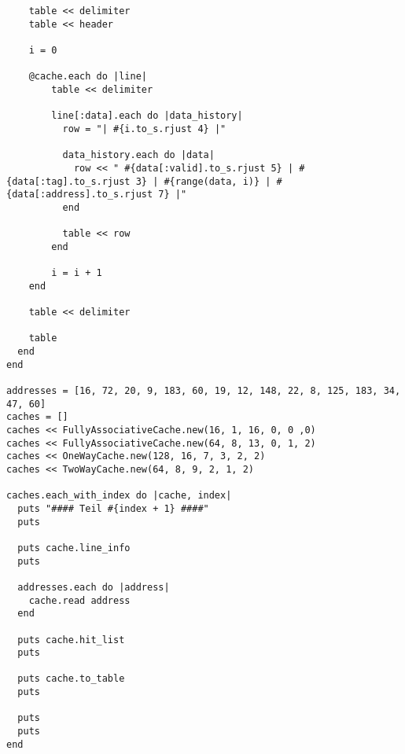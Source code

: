 \documentclass[10pt,a4paper]{article}
\begin{document}
\begin{lstlisting}
    table << delimiter
    table << header

    i = 0

    @cache.each do |line|
        table << delimiter

        line[:data].each do |data_history|
          row = "| #{i.to_s.rjust 4} |"

          data_history.each do |data|
            row << " #{data[:valid].to_s.rjust 5} | #{data[:tag].to_s.rjust 3} | #{range(data, i)} | #{data[:address].to_s.rjust 7} |"
          end

          table << row
        end

        i = i + 1
    end

    table << delimiter

    table
  end
end

addresses = [16, 72, 20, 9, 183, 60, 19, 12, 148, 22, 8, 125, 183, 34, 47, 60]
caches = []
caches << FullyAssociativeCache.new(16, 1, 16, 0, 0 ,0)
caches << FullyAssociativeCache.new(64, 8, 13, 0, 1, 2)
caches << OneWayCache.new(128, 16, 7, 3, 2, 2)
caches << TwoWayCache.new(64, 8, 9, 2, 1, 2)

caches.each_with_index do |cache, index|
  puts "#### Teil #{index + 1} ####"
  puts

  puts cache.line_info
  puts

  addresses.each do |address|
    cache.read address
  end

  puts cache.hit_list
  puts

  puts cache.to_table
  puts

  puts
  puts
end
\end{lstlisting}
\end{document}
